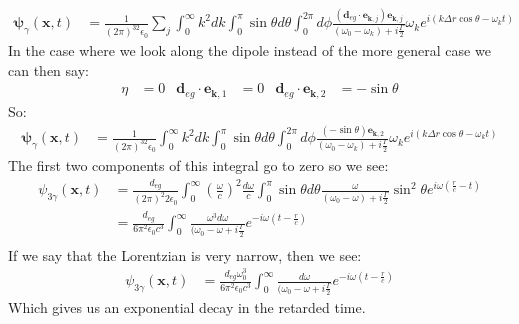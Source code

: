 \begin{align*}
	\bm{\psi}_\gamma(\bm{x},t) &= \frac{1}{(2\pi)^32\epsilon_0} \sum_j \int_0^\infty k^2 dk \int_0^\pi \sin\theta d\theta \int_0^{2\pi} d\phi 
		\frac{(\bm{d}_{eg}\cdot\bm{e}_{\bm{k},j})\bm{e}_{\bm{k},j}}{(\omega_0 - \omega_k) + i\frac{\Gamma}{2}}\omega_k e^{i(k\Delta r\cos\theta -\omega_k t)}
\end{align*}
In the case where we look along the dipole instead of the more general case we can then say:
\begin{align*}
	\eta &= 0 & \bm{d}_{eg}\cdot\bm{e}_{\bm{k},1} &= 0 & \bm{d}_{eg}\cdot\bm{e}_{\bm{k},2} &= -\sin\theta
\end{align*}
So:
\begin{align*}
	\bm{\psi}_\gamma(\bm{x},t) &= \frac{1}{(2\pi)^32\epsilon_0} \int_0^\infty k^2 dk \int_0^\pi \sin\theta d\theta \int_0^{2\pi} d\phi 
		\frac{(-\sin\theta)\bm{e}_{\bm{k},2}}{(\omega_0 - \omega_k) + i\frac{\Gamma}{2}}\omega_k e^{i(k\Delta r\cos\theta -\omega_k t)}
\end{align*}
The first two components of this integral go to zero so we see:
\begin{align*}
	\psi_{3\gamma}(\bm{x},t) &= \frac{d_{eg}}{(2\pi)^2 2\epsilon_0} \int_0^\infty \left(\frac{\omega}{c}\right)^2 \frac{d\omega}{c} \int_0^\pi \sin\theta d\theta \frac{\omega}{(\omega_0-\omega) + i\frac{\Gamma}{2}} \sin^2\theta e^{i\omega\left(\frac{r}{c} - t\right)}\\
	&= \frac{d_{eg}}{6\pi^2\epsilon_0c^3} \int_0^\infty \frac{\omega^3 d\omega}{(\omega_0-\omega + i\frac{\Gamma}{2}} e^{-i\omega\left(t-\frac{r}{c}\right)} \\
\end{align*}
If we say that the Lorentzian is very narrow, then we see:
\begin{align*}
	\psi_{3\gamma}(\bm{x},t) &= \frac{d_{eg}\omega_0^3 }{6\pi^2\epsilon_0c^3} \int_0^\infty \frac{d\omega}{(\omega_0-\omega + i\frac{\Gamma}{2}} e^{-i\omega\left(t-\frac{r}{c}\right)}
\end{align*}
Which gives us an exponential decay in the retarded time.

